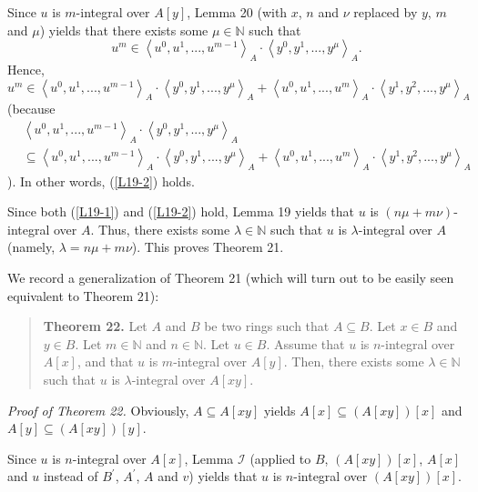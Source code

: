 \documentclass[12pt,final,notitlepage,onecolumn]{article}%
\begin{document}
Since $u$ is $m$-integral over $A\left[  y\right]  $, Lemma 20 (with $x$, $n$
and $\nu$ replaced by $y$, $m$ and $\mu$) yields that there exists some
$\mu\in\mathbb{N}$ such that%
\[
u^{m}\in\left\langle u^{0},u^{1},...,u^{m-1}\right\rangle _{A}\cdot
\left\langle y^{0},y^{1},...,y^{\mu}\right\rangle _{A}.
\]
Hence,%
\[
u^{m}\in\left\langle u^{0},u^{1},...,u^{m-1}\right\rangle _{A}\cdot
\left\langle y^{0},y^{1},...,y^{\mu}\right\rangle _{A}+\left\langle
u^{0},u^{1},...,u^{m}\right\rangle _{A}\cdot\left\langle y^{1},y^{2}%
,...,y^{\mu}\right\rangle _{A}%
\]
(because%
\begin{align*}
&  \left\langle u^{0},u^{1},...,u^{m-1}\right\rangle _{A}\cdot\left\langle
y^{0},y^{1},...,y^{\mu}\right\rangle _{A}\\
&  \subseteq\left\langle u^{0},u^{1},...,u^{m-1}\right\rangle _{A}%
\cdot\left\langle y^{0},y^{1},...,y^{\mu}\right\rangle _{A}+\left\langle
u^{0},u^{1},...,u^{m}\right\rangle _{A}\cdot\left\langle y^{1},y^{2}%
,...,y^{\mu}\right\rangle _{A}%
\end{align*}
). In other words, (\ref{L19-2}) holds.

Since both (\ref{L19-1}) and (\ref{L19-2}) hold, Lemma 19 yields that $u$ is
$\left(  n\mu+m\nu\right)  $-integral over $A$. Thus, there exists some
$\lambda\in\mathbb{N}$ such that $u$ is $\lambda$-integral over $A$ (namely,
$\lambda=n\mu+m\nu$). This proves Theorem 21.

We record a generalization of Theorem 21 (which will turn out to be easily
seen equivalent to Theorem 21):

\begin{quote}
\textbf{Theorem 22.} Let $A$ and $B$ be two rings such that $A\subseteq B$.
Let $x\in B$ and $y\in B$. Let $m\in\mathbb{N}$ and $n\in\mathbb{N}$. Let
$u\in B$. Assume that $u$ is $n$-integral over $A\left[  x\right]  $, and that
$u$ is $m$-integral over $A\left[  y\right]  $. Then, there exists some
$\lambda\in\mathbb{N}$ such that $u$ is $\lambda$-integral over $A\left[
xy\right]  $.
\end{quote}

\textit{Proof of Theorem 22.} Obviously, $A\subseteq A\left[  xy\right]  $
yields $A\left[  x\right]  \subseteq\left(  A\left[  xy\right]  \right)
\left[  x\right]  $ and $A\left[  y\right]  \subseteq\left(  A\left[
xy\right]  \right)  \left[  y\right]  $.

Since $u$ is $n$-integral over $A\left[  x\right]  $, Lemma $\mathcal{I}$
(applied to $B$, $\left(  A\left[  xy\right]  \right)  \left[  x\right]  $,
$A\left[  x\right]  $ and $u$ instead of $B^{\prime}$, $A^{\prime}$, $A$ and
$v$) yields that $u$ is $n$-integral over $\left(  A\left[  xy\right]
\right)  \left[  x\right]  $.
\end{document}
